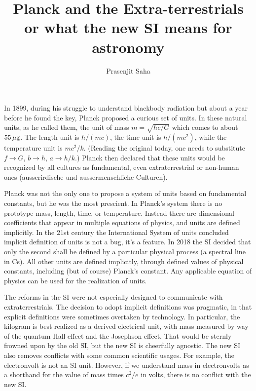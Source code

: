 \documentclass[aps,prb,12pt]{revtex4-1}
\begin{document}
\title{Planck and the Extra-terrestrials\\
       or what the new SI means for astronomy}

\author{Prasenjit Saha} 


\maketitle

In 1899, during his struggle to understand blackbody radiation but
about a year before he found the key, Planck proposed a curious set of
units.\cite{Planck1899} In these natural units, as he called them, the
unit of mass $m=\sqrt{hc/G}$ which comes to about $55\rm\,\mu g$.  The
length unit is $h/(mc)$, the time unit is $h/(mc^2)$, while the
temperature unit is $mc^2/k$.  (Reading the original today, one needs
to substitute $f \rightarrow G$, $b\rightarrow h$, $a\rightarrow
h/k$.)  Planck then declared that these units would be recognized by
all cultures as fundamental, even extraterrestrial or non-human ones
(ausserirdische und aussermenschliche Culturen).

Planck was not the only one to propose a system of units based on
fundamental constants,\cite{Tomilin1998} but he was the most
prescient.  In Planck's system there is no prototype mass, length,
time, or temperature.  Instead there are dimensional coefficients that
appear in multiple equations of physics, and units are defined
implicitly.  In the 21st century the International System of units
concluded implicit definition of units is not a bug, it's a feature.
In 2018 the SI decided that only the second shall be defined by a
particular physical process (a spectral line in Cs).  All other units
are defined implicitly, through defined values of physical constants,
including (but of course) Planck's constant.  Any applicable equation
of physics can be used for the realization of
units.\cite{Jeckelmann_2018}

The reforms in the SI were not especially designed to communicate with
extraterrestrials.  The decision to adopt implicit definitions was
pragmatic, in that explicit definitions were sometimes overtaken by
technology.  In particular, the kilogram is best realized as a derived
electrical unit, with mass measured by way of the quantum Hall effect
and the Josephson effect.  That would be sternly frowned upon by the
old SI, but the new SI is cheerfully agnostic.  The new SI also
removes conflicts with some common scientific usages.  For example,
the electronvolt is not an SI unit.  However, if we understand mass in
electronvolts as a shorthand for the value of mass times $c^2/e$ in
volts, there is no conflict with the new SI.
\end{document}
